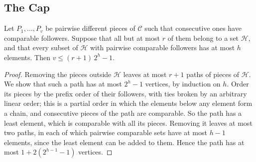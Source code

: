\subsection{The Cap}\label{app:compression-cap}

\begin{lemma}\label{lem:simple-path}
Let $P_1,\dots,P_v$ be pairwise different pieces of $\mathcal C$ such that
consecutive ones have comparable followers. Suppose that all but at most
$r$ of them belong to a set $\mathcal H$, and that every subset of
$\mathcal H$ with pairwise comparable followers has at most $h$ elements.
Then $v\le(r+1)\,2^h-1$.
\end{lemma}

\begin{proof}
Removing the pieces outside $\mathcal H$ leaves at most $r+1$ paths of
pieces of $\mathcal H$. We show that such a path has at most $2^h-1$
vertices, by induction on $h$. Order its pieces by the prefix order of
their followers, with ties broken by an arbitrary linear order; this is a
partial order in which the elements below any element form a chain, and
consecutive pieces of the path are comparable. So the path has a least
element, which is comparable with all its pieces. Removing it leaves at
most two paths, in each of which pairwise comparable sets have at most
$h-1$ elements, since the least element can be added to them. Hence the
path has at most $1+2(2^{h-1}-1)$ vertices.
\end{proof}

